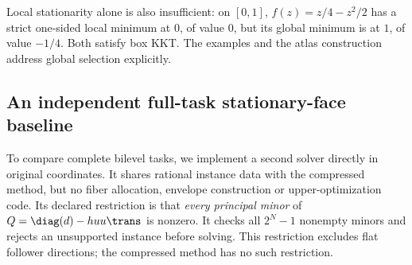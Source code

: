 Local stationarity alone is also insufficient: on $[0,1]$,
$f(z)=z/4-z^2/2$ has a strict one-sided local minimum at $0$, of value $0$,
but its global minimum is at $1$, of value $-1/4$. Both satisfy box KKT.
The examples and the atlas construction address global selection explicitly.

\subsection{An independent full-task stationary-face baseline}
\label{subsec:full-task-baseline}
To compare complete bilevel tasks, we implement a second solver directly in
original coordinates. It shares rational instance data with the compressed
method, but no fiber allocation, envelope construction or upper-optimization
code. Its declared restriction is that \emph{every principal minor} of
$Q=\diag(d)-huu\trans$ is nonzero. It checks all $2^N-1$ nonempty minors
and rejects an unsupported instance before solving. This restriction excludes
flat follower directions; the compressed method has no such restriction.


